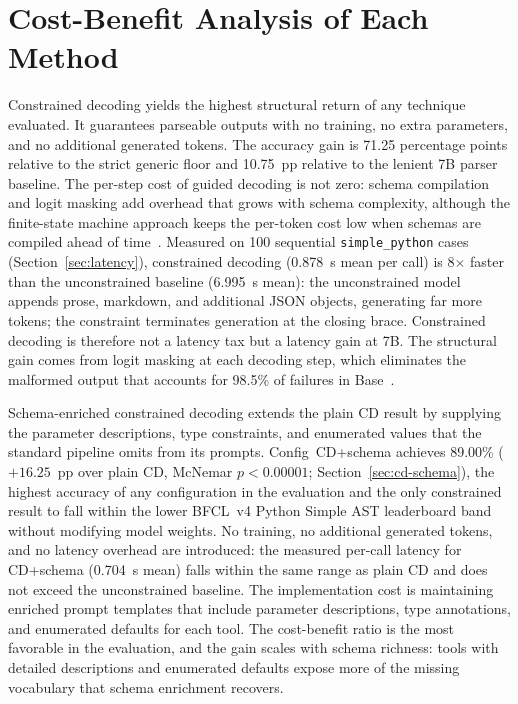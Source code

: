 \section{Cost-Benefit Analysis of Each Method}

Constrained decoding yields the highest structural return of any technique
evaluated. It guarantees parseable outputs with no training, no extra
parameters, and no additional generated tokens. The accuracy gain is 71.25
percentage points relative to the strict generic floor and 10.75~pp relative to
the lenient 7B parser baseline. The per-step cost of guided decoding is not
zero: schema compilation and logit masking add overhead that grows with schema
complexity, although the finite-state machine approach keeps the per-token cost
low when schemas are compiled ahead of time~\cite{willard2023efficient}.
Measured on 100 sequential \texttt{simple\_python} cases
(Section~\ref{sec:latency}), constrained decoding (0.878~s mean per call) is
8$\times$ faster than the unconstrained baseline (6.995~s mean): the
unconstrained model appends prose, markdown, and additional JSON objects,
generating far more tokens; the constraint terminates generation at the closing
brace. Constrained decoding is therefore not a latency tax but a latency gain
at 7B. The structural gain comes from logit masking at each decoding step,
which eliminates the malformed output that accounts for 98.5\% of failures in
Base~\cite{willard2023efficient, kwon2023vllm}.

Schema-enriched constrained decoding extends the plain CD result by supplying
the parameter descriptions, type constraints, and enumerated values that the
standard pipeline omits from its prompts. Config~CD+schema achieves 89.00\%
($+16.25$~pp over plain CD, McNemar $p < 0.00001$;
Section~\ref{sec:cd-schema}), the highest accuracy of any configuration in
the evaluation and the only constrained result to fall within the lower BFCL~v4
Python Simple AST leaderboard band without modifying model weights. No training, no additional generated tokens, and no
latency overhead are introduced: the measured per-call latency for CD+schema
(0.704~s mean) falls within the same range as plain CD and does not exceed
the unconstrained baseline. The implementation cost is maintaining enriched
prompt templates that include parameter descriptions, type annotations, and
enumerated defaults for each tool. The cost-benefit ratio is the most
favorable in the evaluation, and the gain scales with schema richness: tools
with detailed descriptions and enumerated defaults expose more of the missing
vocabulary that schema enrichment recovers.


